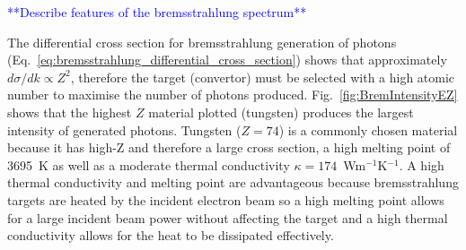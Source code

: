 \documentclass[../main.tex]{subfiles}
\begin{document}
\textcolor{blue}{**Describe features of the bremsstrahlung spectrum**}

The differential cross section for bremsstrahlung generation of photons (Eq.~\ref{eq:bremsstrahlung_differential_cross_section}) shows that approximately $d\sigma/dk \propto Z^{2}$, therefore the target (convertor) must be selected with a high atomic number to maximise the number of photons produced. Fig.~\ref{fig:BremIntensityEZ} shows that the highest $Z$ material plotted (tungsten) produces the largest intensity of generated photons. Tungsten ($Z = 74$) is a commonly chosen material because it has high-Z and therefore a large cross section, a high melting point of 3695~\si{\kelvin} as well as a moderate thermal conductivity $\kappa = 174$~\si{\watt}\si{\meter}$^{-1}$\si{\kelvin}$^{-1}$. A high thermal conductivity and melting point are advantageous because bremsstrahlung targets are heated by the incident electron beam so a high melting point allows for a large incident beam power without affecting the target and a high thermal conductivity allows for the heat to be dissipated effectively. 
\end{document}
